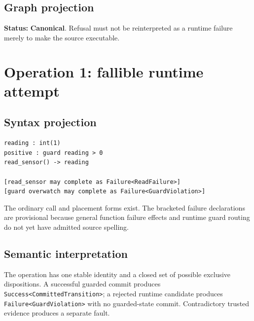 \documentclass[11pt,a4paper]{article}
\newcommand{\canonical}{\textcolor{LyraGreen}{\textbf{Canonical}}\xspace}
\newcommand{\code}[1]{\texttt{#1}}
\begin{document}
\subsection*{Graph projection}

\begin{center}
\end{center}

\textbf{Status:} \canonical. Refusal must not be reinterpreted as a runtime
failure merely to make the source executable.

\section{Operation 1: fallible runtime attempt}

\subsection*{Syntax projection}

\begin{lstlisting}[style=lyraform]
reading : int(1)
positive : guard reading > 0
read_sensor() -> reading

[read_sensor may complete as Failure<ReadFailure>]
[guard overwatch may complete as Failure<GuardViolation>]
\end{lstlisting}

The ordinary call and placement forms exist. The bracketed failure declarations
are provisional because general function failure effects and runtime guard
routing do not yet have admitted source spelling.

\subsection*{Semantic interpretation}

The operation has one stable identity and a closed set of possible exclusive
dispositions. A successful guarded commit produces
\code{Success<CommittedTransition>}; a rejected runtime candidate produces
\code{Failure<GuardViolation>} with no guarded-state commit. Contradictory
trusted evidence produces a separate fault.
\end{document}

